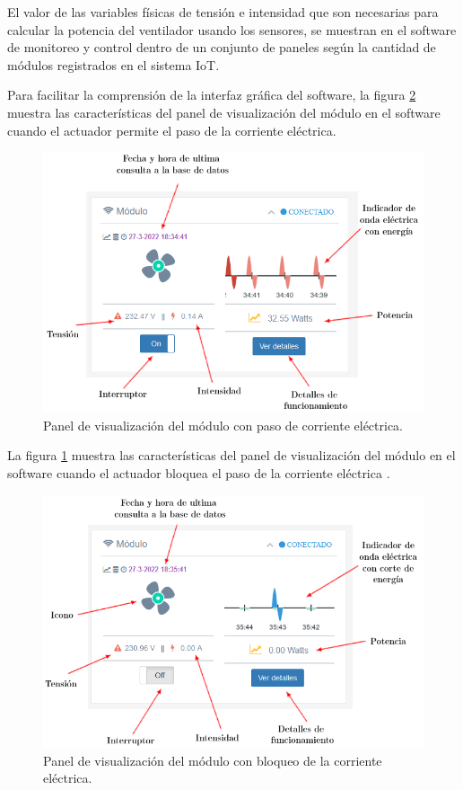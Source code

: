El valor de las variables físicas de tensión e intensidad que son necesarias para calcular la  potencia del ventilador usando los sensores, se muestran en el software de monitoreo y control dentro de un conjunto de paneles según la cantidad de módulos registrados en el sistema IoT.

Para facilitar la comprensión de la interfaz gráfica del software, la figura \ref{fig:test-panel5} muestra las características del panel de visualización del módulo en el software cuando el actuador permite el paso de la corriente eléctrica.

\begin{figure}[htpb]
\centering 
\includegraphics[width=1.0\textwidth]{./Figures/test/consumo/panel5.png}
\caption{Panel de visualización del módulo con paso de corriente eléctrica.}
\label{fig:test-panel4}
\end{figure}

La figura \ref{fig:test-panel4} muestra las características del panel de visualización del módulo en el software cuando el actuador bloquea el paso de la corriente eléctrica .

\begin{figure}[htpb]
\centering 
\includegraphics[width=1.0\textwidth]{./Figures/test/consumo/panel4.png}
\caption{Panel de visualización del módulo con bloqueo de la corriente eléctrica.}
\label{fig:test-panel5}
\end{figure}


